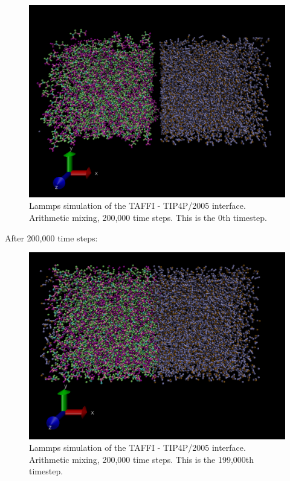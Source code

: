 \documentclass[12pt,reqno]{amsart}
\numberwithin{equation}{section}
\begin{document}
\begin{enumerate}
\begin{figure}[H]
\centering
\includegraphics[scale=0.4]{lammps_taffi-tip4p2005_0}
\caption{Lammps simulation of the TAFFI - TIP4P/2005 interface.  Arithmetic mixing, 200,000 time steps.  This is the 0th timestep.}
\end{figure}

After 200,000 time steps:

\begin{figure}[H]
\centering
\includegraphics[scale=0.4]{lammps_taffi-tip4p2005_200000}
\caption{Lammps simulation of the TAFFI - TIP4P/2005 interface.  Arithmetic mixing, 200,000 time steps.  This is the 199,000th timestep.}
\end{figure}


\end{enumerate}
\end{document}

